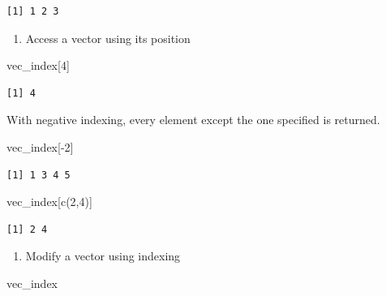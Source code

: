 \documentclass[
  letterpaper,
  DIV=11,
  numbers=noendperiod]{scrreprt}
\newenvironment{Shaded}{\begin{snugshade}}{\end{snugshade}}
\newcommand{\DecValTok}[1]{\textcolor[rgb]{0.68,0.00,0.00}{#1}}
\newcommand{\FunctionTok}[1]{\textcolor[rgb]{0.28,0.35,0.67}{#1}}
\newcommand{\NormalTok}[1]{\textcolor[rgb]{0.00,0.23,0.31}{#1}}
\newcommand{\SpecialCharTok}[1]{\textcolor[rgb]{0.37,0.37,0.37}{#1}}
\providecommand{\tightlist}{%
  \setlength{\itemsep}{0pt}\setlength{\parskip}{0pt}}\usepackage{longtable,booktabs,array}
\begin{document}
\begin{verbatim}
[1] 1 2 3
\end{verbatim}

\begin{enumerate}
\def\labelenumi{\alph{enumi})}
\setcounter{enumi}{2}
\tightlist
\item
  Access a vector using its position
\end{enumerate}

\begin{Shaded}
\begin{Highlighting}[]
\NormalTok{vec\_index[}\DecValTok{4}\NormalTok{]}
\end{Highlighting}
\end{Shaded}

\begin{verbatim}
[1] 4
\end{verbatim}

With negative indexing, every element except the one specified is
returned.

\begin{Shaded}
\begin{Highlighting}[]
\NormalTok{vec\_index[}\SpecialCharTok{{-}}\DecValTok{2}\NormalTok{]}
\end{Highlighting}
\end{Shaded}

\begin{verbatim}
[1] 1 3 4 5
\end{verbatim}

\begin{Shaded}
\begin{Highlighting}[]
\NormalTok{vec\_index[}\FunctionTok{c}\NormalTok{(}\DecValTok{2}\NormalTok{,}\DecValTok{4}\NormalTok{)]}
\end{Highlighting}
\end{Shaded}

\begin{verbatim}
[1] 2 4
\end{verbatim}

\begin{enumerate}
\def\labelenumi{\alph{enumi})}
\setcounter{enumi}{3}
\tightlist
\item
  Modify a vector using indexing
\end{enumerate}

\begin{Shaded}
\begin{Highlighting}[]
\NormalTok{vec\_index}
\end{Highlighting}
\end{Shaded}
\end{document}
